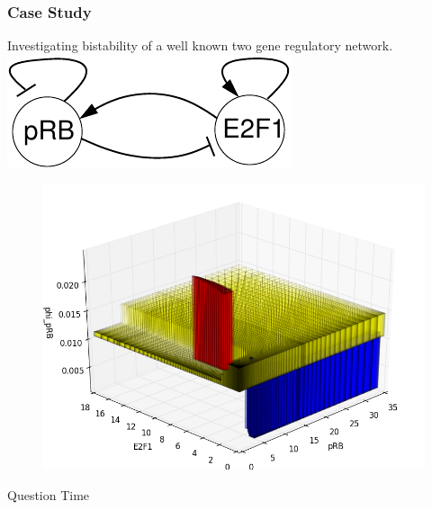\documentclass{beamer}
\begin{document}
  \begin{frame}
  	\frametitle{Case Study}
  	\vspace{-4em}
  	Investigating bistability of a well known two gene regulatory network. 
  	\newline\newline\newline\newline\newline
	\includegraphics[scale=.63]{gs1net.pdf}
  	\begin{figure}
  		\vspace{-11em}
	  \begin{center}
   		\includegraphics[scale=.43]{3d.png}
	  \end{center}
	\end{figure}
  \end{frame}
  \begin{frame}
	\begin{center}
		Question Time
	\end{center}
  \end{frame}
\end{document}
